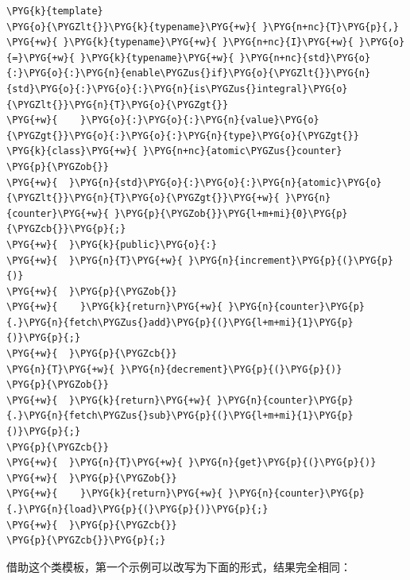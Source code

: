 
\begin{codeblockbg}
\begin{Verbatim}[commandchars=\\\{\},breaklines=true,breakanywhere=true,fontsize=\codefont,xleftmargin=17bp]
\PYG{k}{template}
\PYG{o}{\PYGZlt{}}\PYG{k}{typename}\PYG{+w}{ }\PYG{n+nc}{T}\PYG{p}{,}
\PYG{+w}{ }\PYG{k}{typename}\PYG{+w}{ }\PYG{n+nc}{I}\PYG{+w}{ }\PYG{o}{=}\PYG{+w}{ }\PYG{k}{typename}\PYG{+w}{ }\PYG{n+nc}{std}\PYG{o}{:}\PYG{o}{:}\PYG{n}{enable\PYGZus{}if}\PYG{o}{\PYGZlt{}}\PYG{n}{std}\PYG{o}{:}\PYG{o}{:}\PYG{n}{is\PYGZus{}integral}\PYG{o}{\PYGZlt{}}\PYG{n}{T}\PYG{o}{\PYGZgt{}}
\PYG{+w}{    }\PYG{o}{:}\PYG{o}{:}\PYG{n}{value}\PYG{o}{\PYGZgt{}}\PYG{o}{:}\PYG{o}{:}\PYG{n}{type}\PYG{o}{\PYGZgt{}}
\PYG{k}{class}\PYG{+w}{ }\PYG{n+nc}{atomic\PYGZus{}counter}
\PYG{p}{\PYGZob{}}
\PYG{+w}{  }\PYG{n}{std}\PYG{o}{:}\PYG{o}{:}\PYG{n}{atomic}\PYG{o}{\PYGZlt{}}\PYG{n}{T}\PYG{o}{\PYGZgt{}}\PYG{+w}{ }\PYG{n}{counter}\PYG{+w}{ }\PYG{p}{\PYGZob{}}\PYG{l+m+mi}{0}\PYG{p}{\PYGZcb{}}\PYG{p}{;}
\PYG{+w}{  }\PYG{k}{public}\PYG{o}{:}
\PYG{+w}{  }\PYG{n}{T}\PYG{+w}{ }\PYG{n}{increment}\PYG{p}{(}\PYG{p}{)}
\PYG{+w}{  }\PYG{p}{\PYGZob{}}
\PYG{+w}{    }\PYG{k}{return}\PYG{+w}{ }\PYG{n}{counter}\PYG{p}{.}\PYG{n}{fetch\PYGZus{}add}\PYG{p}{(}\PYG{l+m+mi}{1}\PYG{p}{)}\PYG{p}{;}
\PYG{+w}{  }\PYG{p}{\PYGZcb{}}
\PYG{n}{T}\PYG{+w}{ }\PYG{n}{decrement}\PYG{p}{(}\PYG{p}{)}
\PYG{p}{\PYGZob{}}
\PYG{+w}{  }\PYG{k}{return}\PYG{+w}{ }\PYG{n}{counter}\PYG{p}{.}\PYG{n}{fetch\PYGZus{}sub}\PYG{p}{(}\PYG{l+m+mi}{1}\PYG{p}{)}\PYG{p}{;}
\PYG{p}{\PYGZcb{}}
\PYG{+w}{  }\PYG{n}{T}\PYG{+w}{ }\PYG{n}{get}\PYG{p}{(}\PYG{p}{)}
\PYG{+w}{  }\PYG{p}{\PYGZob{}}
\PYG{+w}{    }\PYG{k}{return}\PYG{+w}{ }\PYG{n}{counter}\PYG{p}{.}\PYG{n}{load}\PYG{p}{(}\PYG{p}{)}\PYG{p}{;}
\PYG{+w}{  }\PYG{p}{\PYGZcb{}}
\PYG{p}{\PYGZcb{}}\PYG{p}{;}
\end{Verbatim}
\end{codeblockbg}



借助这个类模板，第一个示例可以改写为下面的形式，结果完全相同：



